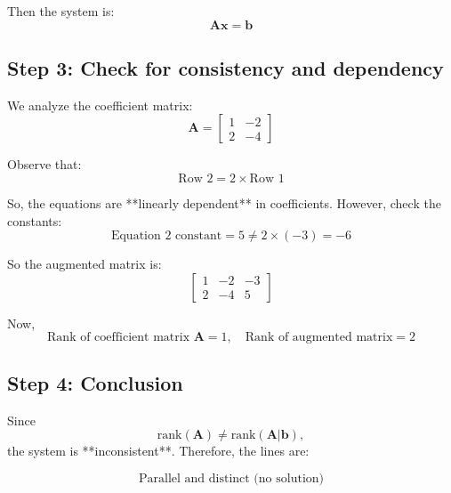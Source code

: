 \documentclass[journal]{IEEEtran}
\begin{document}
Then the system is:
\begin{equation}
\mathbf{A} \mathbf{x} = \mathbf{b}
\end{equation}

\subsection*{Step 3: Check for consistency and dependency}

We analyze the coefficient matrix:
\[
\mathbf{A} = \begin{bmatrix} 1 & -2 \\ 2 & -4 \end{bmatrix}
\]

Observe that:
\begin{equation}
\text{Row 2} = 2 \times \text{Row 1}
\end{equation}

So, the equations are **linearly dependent** in coefficients. However, check the constants:
\[
\text{Equation 2 constant} = 5 \neq 2 \times (-3) = -6
\]

So the augmented matrix is:
\[
\left[\begin{array}{cc|c}
1 & -2 & -3 \\
2 & -4 & 5
\end{array}\right]
\]

Now,
\begin{equation}
\text{Rank of coefficient matrix } \mathbf{A} = 1, \quad
\text{Rank of augmented matrix} = 2
\end{equation}

\subsection*{Step 4: Conclusion}

Since
\[
\text{rank}(\mathbf{A}) \ne \text{rank}(\mathbf{A}|\mathbf{b}),
\]
the system is **inconsistent**. Therefore, the lines are:

\[
\boxed{
\text{Parallel and distinct (no solution)}
}
\]
\end{document}
